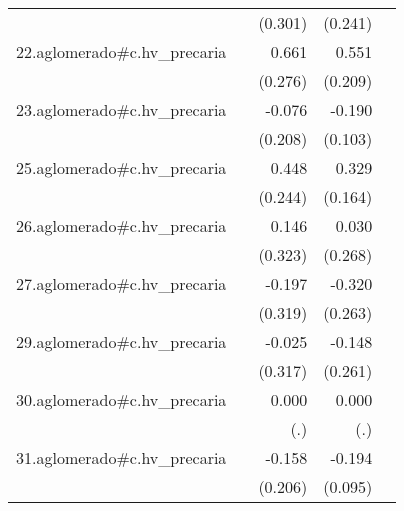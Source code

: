 {\begin{longtable}{l*{4}{D{.}{.}{-1}}}
            &                     &     (0.301)         &     (0.241)         &                     \\
\addlinespace
22.aglomerado#c.hv\_precaria&                     &       0.661\sym{*}  &       0.551\sym{**} &                     \\
            &                     &     (0.276)         &     (0.209)         &                     \\
\addlinespace
23.aglomerado#c.hv\_precaria&                     &      -0.076         &      -0.190         &                     \\
            &                     &     (0.208)         &     (0.103)         &                     \\
\addlinespace
25.aglomerado#c.hv\_precaria&                     &       0.448         &       0.329\sym{*}  &                     \\
            &                     &     (0.244)         &     (0.164)         &                     \\
\addlinespace
26.aglomerado#c.hv\_precaria&                     &       0.146         &       0.030         &                     \\
            &                     &     (0.323)         &     (0.268)         &                     \\
\addlinespace
27.aglomerado#c.hv\_precaria&                     &      -0.197         &      -0.320         &                     \\
            &                     &     (0.319)         &     (0.263)         &                     \\
\addlinespace
29.aglomerado#c.hv\_precaria&                     &      -0.025         &      -0.148         &                     \\
            &                     &     (0.317)         &     (0.261)         &                     \\
\addlinespace
30.aglomerado#c.hv\_precaria&                     &       0.000         &       0.000         &                     \\
            &                     &         (.)         &         (.)         &                     \\
\addlinespace
31.aglomerado#c.hv\_precaria&                     &      -0.158         &      -0.194\sym{*}  &                     \\
            &                     &     (0.206)         &     (0.095)         &                     \\

\end{longtable}}
